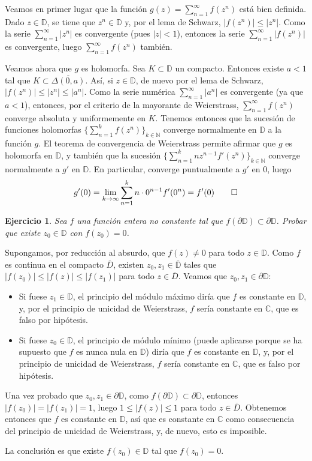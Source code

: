 \documentclass[11pt]{report}
\makeatletter
\renewenvironment{proof}[1][\proofname]{\par
  \pushQED{\qed}%
  \normalfont \topsep\z@skip %
  \trivlist
  \item[\hskip\labelsep
        \itshape
    #1\@addpunct{.}]\ignorespaces
}{%
  \popQED\endtrivlist\@endpefalse
}
\newcommand{\N}{\mathbb N}
\newcommand{\C}{\mathbb C}
\newcommand{\D}{\mathbb D}
\newtheorem{ejercicio}{Ejercicio}
\makeatother
\begin{document}
\begin{proof}
  Veamos en primer lugar que la función $g(z) = \sum_{n=1}^\infty f(z^n)$ está bien definida. Dado $z \in \D$, se tiene que $z^n \in \D$ y, por el lema de Schwarz, $|f(z^n)| \leq |z^n|$. Como la serie $\sum_{n=1}^\infty |z^n|$ es convergente (pues $|z|<1$), entonces la serie $\sum_{n=1}^\infty |f(z^n)|$ es convergente, luego $\sum_{n=1}^\infty f(z^n)$ también.

  Veamos ahora que $g$ es holomorfa. Sea $K \subset \D$ un compacto. Entonces existe $a<1$ tal que $K \subset \overline{\Delta(0,a)}$. Así, si $z \in \D$, de nuevo por el lema de Schwarz, $|f(z^n)| \leq |z^n| \leq |a^n|$. Como la serie numérica $\sum_{n=1}^\infty |a^n|$ es convergente (ya que $a<1$), entonces, por el criterio de la mayorante de Weierstrass, $\sum_{n=1}^\infty f(z^n)$ converge absoluta y uniformemente en $K$. Tenemos entonces que la sucesión de funciones holomorfas $\{\sum_{n=1}^k f(z^n)\}_{k \in \N}$ converge normalmente en $\D$ a la función $g$. El teorema de convergencia de Weierstrass permite afirmar que $g$ es holomorfa en $\D$, y también que la sucesión $\{\sum_{n=1}^{k}nz^{n-1}f'(z^n)\}_{k \in \N}$ converge normalmente a $g'$ en $\D$. En particular, converge puntualmente a $g'$ en $0$, luego
  \[g'(0)=\lim_{k \to \infty} \sum_{n=1}^{k}n \cdot 0^{n-1}f'(0^n) = f'(0) \qedhere\]

\end{proof}

\begin{ejercicio}
  Sea $f$ una función entera no constante tal que $f(\partial \D) \subset \partial \D$. Probar que existe $z_0 \in \D$ con $f(z_0)=0$.
\end{ejercicio}

\begin{proof}
  Supongamos, por reducción al absurdo, que $f(z) \neq 0$ para todo $z \in \D$. Como $f$ es continua en el compacto $\overline{D}$, existen $z_0,z_1 \in \overline{\D}$ tales que $|f(z_0)| \leq |f(z)| \leq |f(z_1)|$ para todo $z \in \overline{D}$. Veamos que $z_0,z_1 \in \partial \D$:
  \begin{itemize}
    \item Si fuese $z_1 \in \D$, el principio del módulo máximo diría que $f$ es constante en $\D$, y, por el principio de unicidad de Weierstrass, $f$ sería constante en $\C$, que es falso por hipótesis.
    \item Si fuese $z_0 \in \D$, el principio de módulo mínimo (puede aplicarse porque se ha supuesto que $f$ es nunca nula en $\D$) diría que $f$ es constante en $\D$, y, por el principio de unicidad de Weierstrass, $f$ sería constante en $\C$, que es falso por hipótesis.
  \end{itemize} 
  Una vez probado que $z_0,z_1 \in \partial \D$, como $f(\partial \D) \subset \partial\D$, entonces $|f(z_0)| = |f(z_1)|=1$, luego $1 \leq |f(z)| \leq 1$ para todo $z \in \overline{D}$. Obtenemos entonces que $f$ es constante en $\D$, así que es constante en $\C$ como consecuencia del principio de unicidad de Weierstrass, y, de nuevo, esto es imposible.

  La conclusión es que existe $f(z_0) \in \D$ tal que $f(z_0) = 0$.
\end{proof}
\end{document}

